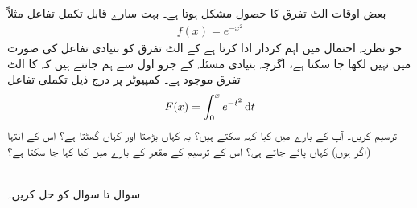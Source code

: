 بعض اوقات الٹ تفرق کا حصول مشکل ہوتا ہے۔ بہت سارے قابل تکمل تفاعل مثلاً
\begin{align*}
f(x)=e^{-x^2}
\end{align*}
جو  نظریہ احتمال میں اہم کردار ادا کرتا ہے کے الٹ تفرق کو بنیادی تفاعل کی صورت میں نہیں لکھا جا سکتا ہے، اگرچہ بنیادی مسئلہ کے جزو اول سے ہم جانتے ہیں کہ  کا الٹ تفرق موجود ہے۔ کمپیوٹر پر درج ذیل تکملی تفاعل
\begin{align*}
F(x)=\int_0^xe^{-t^2}\dif t
\end{align*}
ترسیم کریں۔ آپ  کے بارے میں کیا کہہ سکتے ہیں؟ یہ کہاں بڑھتا اور کہاں گھٹتا ہے؟ اس کے انتہا (اگر ہوں) کہاں پائے جاتے ہی؟ اس کے ترسیم کے مقعر کے بارے میں کیا کہا جا سکتا ہے؟

\\
سوال  تا سوال  کو حل کریں۔

